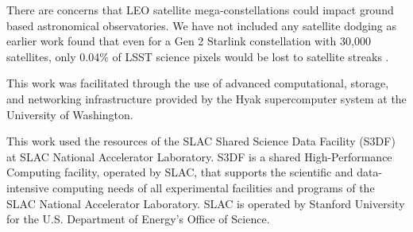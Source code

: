 \documentclass[]{aastex631}
\begin{document}
There are concerns that LEO satellite mega-constellations could impact ground based astronomical observatories. We have not included any satellite dodging as earlier work found that even for a Gen 2 Starlink constellation with 30,000 satellites, only 0.04\% of LSST science pixels would be lost to satellite streaks \citep{Hu2022, Yoachim2025}.

          
{}


\begin{acknowledgments}
This work was facilitated through the use of advanced computational, storage, and networking infrastructure provided by the Hyak supercomputer system at the University of Washington.

This work used the resources of the SLAC Shared Science Data Facility (S3DF) at SLAC National Accelerator Laboratory. S3DF is a shared High-Performance Computing facility, operated by SLAC, that supports the scientific and data-intensive computing needs of all experimental facilities and programs of the SLAC National Accelerator Laboratory. SLAC is operated by Stanford University for the U.S. Department of Energy’s Office of Science.
\end{acknowledgments}
\end{document}
